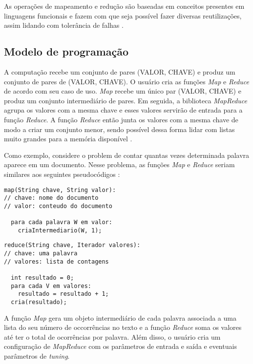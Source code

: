 As operações de mapeamento e redução são baseadas em conceitos presentes em linguagens funcionais e fazem com que seja possível fazer diversas reutilizações, assim lidando com tolerância de falhas \cite{MapReduce08}. 

\subsection{Modelo de programação}\label{ssec:mapreducemodelo}

A computação recebe um conjunto de pares (VALOR, CHAVE) e produz um conjunto de pares de (VALOR, CHAVE). O usuário cria as funções \textit{Map} e \textit{Reduce} de acordo com seu caso de uso. \textit{Map} recebe um único par (VALOR, CHAVE) e produz um conjunto intermediário de pares. Em seguida, a biblioteca \textit{MapReduce} agrupa os valores com a mesma chave e esses valores servirão de entrada para a função \textit{Reduce}. A função \textit{Reduce} então junta os valores com a mesma chave de modo a criar um conjunto menor, sendo possível dessa forma lidar com listas muito grandes para a memória disponível \cite{MapReduce04}.

Como exemplo, considere o problem de contar quantas vezes determinada palavra aparece em um documento. Nesse problema, as funções \textit{Map} e \textit{Reduce} seriam similares aos seguintes pseudocódigos \cite{MapReduce08}:

\begin{lstlisting}[title={Código 1: Exemplo de função Map em pseudocódigo adaptado de \cite{MapReduce08}}]
map(String chave, String valor):
// chave: nome do documento
// valor: conteudo do documento

  para cada palavra W em valor:
    criaIntermediario(W, 1);
\end{lstlisting}

\begin{lstlisting}[title={Código 2: Exemplo de função Reduce em pseudocódigo adaptado de \cite{MapReduce08}}]
reduce(String chave, Iterador valores):
// chave: uma palavra
// valores: lista de contagens

  int resultado = 0;
  para cada V em valores:
    resultado = resultado + 1;
  cria(resultado);
\end{lstlisting}

A função \textit{Map} gera um objeto intermediário de cada palavra associada a uma lista do seu número de occorrências no texto e a função \textit{Reduce} soma os valores até ter o total de ocorrências por palavra. Além disso, o usuário cria um configuração de \textit{MapReduce} com os parâmetros de entrada e saída e eventuais parâmetros de \textit{tuning}.

